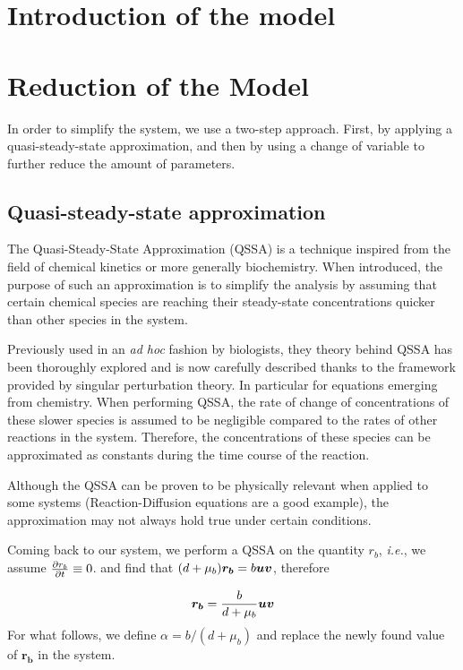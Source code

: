 \section{Introduction of the model}



\section{Reduction of the Model}

In order to simplify the system, we use a two-step approach. First, by applying a quasi-steady-state approximation, and then by using a change of variable to further reduce the amount of parameters. 

\subsection{Quasi-steady-state approximation}

The Quasi-Steady-State Approximation (QSSA) is a  technique inspired from the field of  chemical kinetics or more generally biochemistry. When introduced, the purpose of such an approximation is to simplify the analysis by assuming that certain chemical species are reaching their steady-state concentrations quicker than other species in the system.

Previously used in an \textit{ad hoc} fashion by biologists, they theory behind QSSA has been thoroughly explored and is now carefully described thanks to the framework provided by singular perturbation theory. In particular for equations emerging from chemistry.
When performing QSSA, the rate of change of concentrations of these slower species is assumed to be negligible compared to the rates of other reactions in the system. Therefore, the concentrations of these species can be approximated as constants during the time course of the reaction.

\begin{remark}
Although the QSSA can be proven to be physically relevant when applied to some systems (Reaction-Diffusion equations are a good example), the approximation may not always hold true under certain conditions.
\end{remark}

Coming back to our system, we perform a QSSA on the quantity $r_b$, \textit{i.e.}, we assume $\frac{\partial r_b}{\partial t} \equiv 0$. and find that $(d + \mu_b)\bm{r_b} = b \bm{u} \bm{v} $, therefore

$$\bm{r_b} = \dfrac{b}{d + \mu_b} \bm{u} \bm{v}$$
For what follows, we define $\alpha = b / (d + \mu_b)$ and replace the newly found value of $\bm{r_b}$ in the system.

